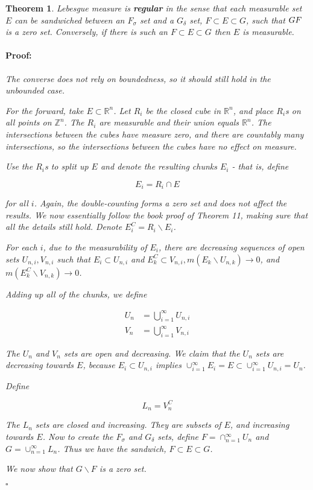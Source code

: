 \documentclass{article}
\newenvironment{proof}{\paragraph{Proof:}}{\hfill$\square$}
\newtheorem{theorem}{Theorem}
\newcommand{\R}{\mathbb{R}}
\newcommand{\Z}{\mathbb{Z}}
\begin{document}
\begin{theorem}
Lebesgue measure is \textbf{regular} in the sense that each measurable set $E$ can be sandwiched between an $F_\sigma$ set and a $G_\delta$ set, $F \subset E \subset G$, such that $G \\ F$ is a zero set. Conversely, if there is such an $F \subset E \subset G$ then $E$ is measurable.

\begin{proof}
The converse does not rely on boundedness, so it should still hold in the unbounded case.

For the forward, take $E \subset \R^n$. Let $R_i$ be the closed cube in $\R^n$, and place $R_i$s on all points on $\Z^n$. The $R_i$ are measurable and their union equals $\R^n$. The intersections between the cubes have measure zero, and there are countably many intersections, so the intersections between the cubes have no effect on measure.

Use the $R_i$s to split up $E$ and denote the resulting chunks $E_i$ - that is, define

\[
E_i = R_i \cap E
\]

for all $i$. Again, the double-counting forms a zero set and does not affect the results. We now essentially follow the book proof of Theorem 11, making sure that all the details still hold. Denote $E^C_i = R_i \backslash E_i$.

For each $i$, due to the measurability of $E_i$, there are decreasing sequences of open sets $U_{n, i}, V_{n, i}$ such that $E_i \subset U_{n, i}$ and $E^C_k \subset V_{n, i}, m(E_k \backslash U_{n, k}) \rightarrow 0$, and $m(E^C_k \backslash V_{n, k}) \rightarrow 0$.

Adding up all of the chunks, we define

\begin{align*}
U_n &= \bigcup_{i=1}^{\infty} U_{n, i} \\
V_n &= \bigcup_{i=1}^{\infty} V_{n, i}
\end{align*}

The $U_n$ and $V_n$ sets are open and decreasing. We claim that the $U_n$ sets are decreasing towards $E$, because $E_i \subset U_{n, i}$ implies $\cup_{i=1}^\infty E_i = E \subset \cup_{i=1}^\infty U_{n, i} = U_n$.

Define

\[
L_n = V_n^C
\]

The $L_n$ sets are closed and increasing. They are subsets of $E$, and increasing towards $E$. Now to create the $F_\sigma$ and $G_\delta$ sets, define $F = \cap_{n=1}^\infty U_n$ and $G = \cup_{n=1}^\infty L_n$. Thus we have the sandwich, $F \subset E \subset G$.

We now show that $G \backslash F$ is a zero set.

\end{proof}
\end{theorem}
\end{document}
